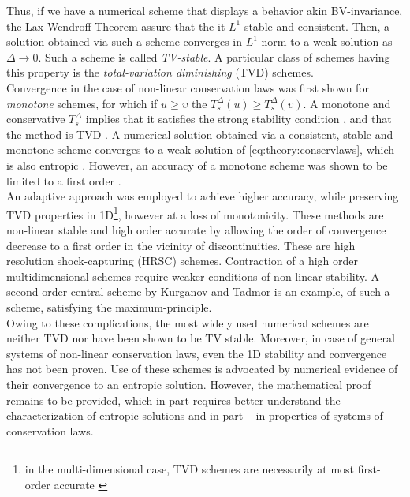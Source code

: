 \documentclass[11pt,a4paper,headinclude=true,DIV=14,BCOR=8mm,chapterprefix,listof=totoc,twoside,openright,abstracton]{scrbook}
\begin{document}
Thus, if we have a numerical scheme that displays a behavior akin BV-invariance, the Lax-Wendroff Theorem assure that the it $L^1$ stable and consistent. Then, a solution obtained via such a scheme converges in $L^1$-norm to a weak solution as $\Delta\rightarrow 0$. Such a scheme is called \textit{TV-stable}. A particular class of schemes having this property is the \textit{total-variation diminishing} (TVD) schemes. \\

Convergence in the case of non-linear conservation laws was first shown for \textit{monotone} schemes, for which if $u \geq \upsilon$ the $T_{s}^{\Delta}(u) \geq T_{s}^{\Delta}(\upsilon)$. A monotone and conservative $T_{s}^{\Delta}$ implies that it satisfies the strong stability condition \cite{Crandall:1980proc}, and that the method is TVD \cite{LeVeque:1992}. A numerical solution obtained via a consistent, stable and monotone scheme converges to a weak solution of \ref{eq:theory:conservlaws}, which is also entropic \cite{Crandall:1980}. However, an accuracy of a monotone scheme was shown to be limited to a first order \cite{Harten:1976}. \\

An adaptive approach was employed to achieve higher accuracy, while preserving TVD properties in 1D\footnote{in the multi-dimensional case, TVD schemes are necessarily at most first-order accurate \cite{Goodman:1985}}, however at a loss of monotonicity. These methods are non-linear stable and high order accurate by allowing the order of convergence decrease to a first order in the vicinity of discontinuities. These are high resolution shock-capturing (HRSC) schemes. Contraction of a high order multidimensional schemes require weaker conditions of non-linear stability. A second-order central-scheme by Kurganov and Tadmor \cite{Kurganov:2000} is an example, of such a scheme, satisfying the maximum-principle. \\

Owing to these complications, the most widely used numerical schemes are neither TVD nor have been shown to be TV stable. Moreover, in case of general systems of non-linear conservation laws, even the 1D stability and convergence has not been proven. Use of these schemes is advocated by numerical evidence of their convergence to an entropic solution. However, the mathematical proof remains to be provided, which in part requires better understand the characterization of entropic solutions \cite{Tadmor1998} and in part -- in properties of systems of conservation laws.  \\
\end{document}
